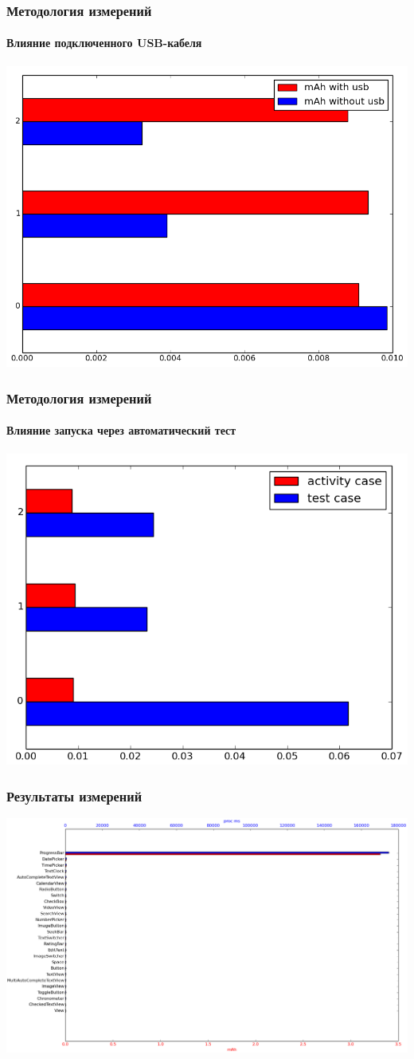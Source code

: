 \documentclass{beamer}
\begin{document}
    \begin{frame}
        \frametitle{Методология измерений}
        \framesubtitle{Влияние подключенного USB-кабеля}
        \begin{center}
            \includegraphics[width=0.9\linewidth]{usb_comparation}
        \end{center}
    \end{frame}
    \begin{frame}
        \frametitle{Методология измерений}
        \framesubtitle{Влияние запуска через автоматический тест}
        \begin{center}
            \includegraphics[width=0.8\linewidth]{test_comparation}
        \end{center}
    \end{frame}
    \begin{frame}
        \frametitle{Результаты измерений}
        \includegraphics[width=\linewidth]{result}
    \end{frame}
\end{document}
